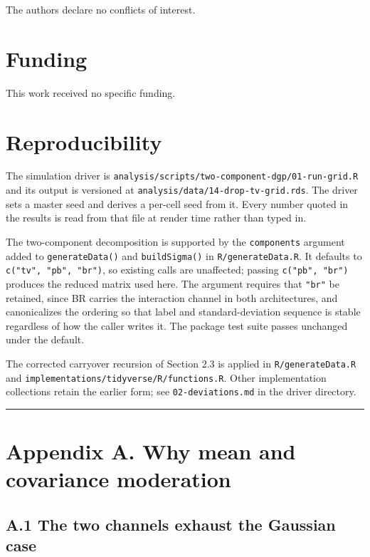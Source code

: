 \documentclass[
  11pt,
]{article}
\begin{document}
The authors declare no conflicts of interest.

\section{Funding}

This work received no specific funding.

\section{Reproducibility}

The simulation driver is
\texttt{analysis/scripts/two-component-dgp/01-run-grid.R} and its
output is versioned at
\texttt{analysis/data/14-drop-tv-grid.rds}. The driver sets a
master seed and derives a per-cell seed from it. Every number quoted
in the results is read from that file at render time rather than
typed in.

The two-component decomposition is supported by the
\texttt{components} argument added to \texttt{generateData()} and
\texttt{buildSigma()} in \texttt{R/generateData.R}. It defaults to
\texttt{c("tv", "pb", "br")}, so existing calls are unaffected;
passing \texttt{c("pb", "br")} produces the reduced matrix used here.
The argument requires that \texttt{"br"} be retained, since BR
carries the interaction channel in both architectures, and
canonicalizes the ordering so that label and standard-deviation
sequence is stable regardless of how the caller writes it. The
package test suite passes unchanged under the default.

The corrected carryover recursion of Section 2.3 is applied in
\texttt{R/generateData.R} and
\texttt{implementations/tidyverse/R/functions.R}. Other
implementation collections retain the earlier form; see
\texttt{02-deviations.md} in the driver directory.

\bigskip\noindent

\rule{\textwidth}{0.4pt}\bigskip

\section{Appendix A. Why mean and covariance moderation}

\subsection{A.1 The two channels exhaust the Gaussian case}
\end{document}
